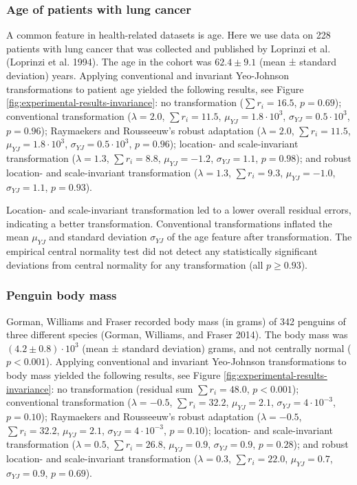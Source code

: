 \documentclass[
  a4paper,
]{article}
\begin{document}
\subsubsection{Age of patients with lung
cancer}\label{age-of-patients-with-lung-cancer}

A common feature in health-related datasets is age. Here we use data on
228 patients with lung cancer that was collected and published by
Loprinzi et al. (Loprinzi et al. 1994). The age in the cohort was
\(62.4 \pm 9.1\) (mean ± standard deviation) years. Applying
conventional and invariant Yeo-Johnson transformations to patient age
yielded the following results, see Figure
\ref{fig:experimental-results-invariance}: no transformation
(\(\sum r_i = 16.5\), \(p = 0.69\)); conventional transformation
(\(\lambda = 2.0\), \(\sum r_i = 11.5\), \(\mu_{YJ} = 1.8 \cdot 10^3\),
\(\sigma_{YJ} = 0.5 \cdot 10^3\), \(p = 0.96\)); Raymaekers and
Rousseeuw's robust adaptation (\(\lambda = 2.0\), \(\sum r_i = 11.5\),
\(\mu_{YJ} = 1.8 \cdot 10^3\), \(\sigma_{YJ} = 0.5 \cdot 10^3\),
\(p = 0.96\)); location- and scale-invariant transformation
(\(\lambda = 1.3\), \(\sum r_i = 8.8\), \(\mu_{YJ} = -1.2\),
\(\sigma_{YJ} = 1.1\), \(p = 0.98\)); and robust location- and
scale-invariant transformation (\(\lambda = 1.3\), \(\sum r_i = 9.3\),
\(\mu_{YJ} = -1.0\), \(\sigma_{YJ} = 1.1\), \(p = 0.93\)).

Location- and scale-invariant transformation led to a lower overall
residual errors, indicating a better transformation. Conventional
transformations inflated the mean \(\mu_{YJ}\) and standard deviation
\(\sigma_{YJ}\) of the age feature after transformation. The empirical
central normality test did not detect any statistically significant
deviations from central normality for any transformation (all
\(p \geq 0.93\)).

\subsubsection{Penguin body mass}\label{penguin-body-mass}

Gorman, Williams and Fraser recorded body mass (in grams) of 342
penguins of three different species (Gorman, Williams, and Fraser 2014).
The body mass was \((4.2 \pm 0.8) \cdot 10^3\) (mean ± standard
deviation) grams, and not centrally normal (\(p < 0.001\)). Applying
conventional and invariant Yeo-Johnson transformations to body mass
yielded the following results, see Figure
\ref{fig:experimental-results-invariance}: no transformation (residual
sum \(\sum r_i = 48.0\), \(p < 0.001\)); conventional transformation
(\(\lambda = -0.5\), \(\sum r_i = 32.2\), \(\mu_{YJ} = 2.1\),
\(\sigma_{YJ} = 4 \cdot 10^{-3}\), \(p = 0.10\)); Raymaekers and
Rousseeuw's robust adaptation (\(\lambda = -0.5\), \(\sum r_i = 32.2\),
\(\mu_{YJ} = 2.1\), \(\sigma_{YJ} = 4 \cdot 10^{-3}\), \(p = 0.10\));
location- and scale-invariant transformation (\(\lambda = 0.5\),
\(\sum r_i = 26.8\), \(\mu_{YJ} = 0.9\), \(\sigma_{YJ} = 0.9\),
\(p = 0.28\)); and robust location- and scale-invariant transformation
(\(\lambda = 0.3\), \(\sum r_i = 22.0\), \(\mu_{YJ} = 0.7\),
\(\sigma_{YJ} = 0.9\), \(p = 0.69\)).
\end{document}
